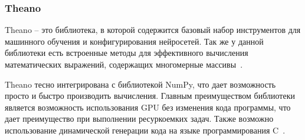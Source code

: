 \subsubsection{Theano}
Theano -- это библиотека, в которой содержится базовый набор инструментов для машинного обучения и конфигурирования нейросетей. Так же у данной библиотеки есть встроенные методы для эффективного вычисления математических выражений, содержащих многомерные массивы~\cite{rashka}.
\par
Theano тесно интегрирована с библиотекой NumPy, что дает возможность просто и быстро производить вычисления. Главным преимуществом библиотеки является возможность использования GPU без изменения кода программы, что дает преимущество при выполнении ресуркоемких задач. Также возможно использование динамической генерации кода на языке программирования C~\cite{douson}.